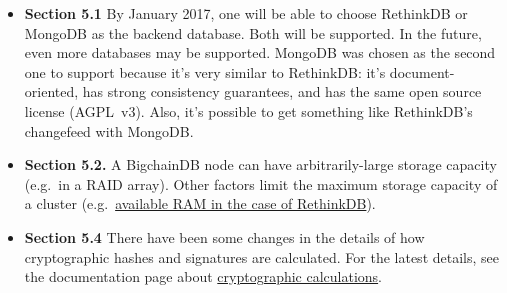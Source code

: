 \documentclass[a4paper]{article}
\begin{document}
\begin{itemize}
  \item \textbf{Section 5.1} By January 2017, one will be able to choose RethinkDB or MongoDB as the backend database. Both will be supported. In the future, even more databases may be supported. MongoDB was chosen as the second one to support because it's very similar to RethinkDB: it's document-oriented, has strong consistency guarantees, and has the same open source license (AGPL~v3). Also, it's possible to get something like RethinkDB's changefeed with MongoDB.

  \item \textbf{Section 5.2.} A BigchainDB node can have arbitrarily-large storage capacity (e.g.~in a RAID array). Other factors limit the maximum storage capacity of a cluster (e.g.~\href{https://bigchaindb.readthedocs.io/en/latest/nodes/node-requirements.html#memory-ram-requirements}{available RAM in the case of RethinkDB}).

  \item \textbf{Section 5.4} There have been some changes in the details of how cryptographic hashes and signatures are calculated. For the latest details, see the documentation page about \href{https://docs.bigchaindb.com/projects/server/en/master/appendices/cryptography.html}{cryptographic calculations}.

\end{itemize}
\end{document}

